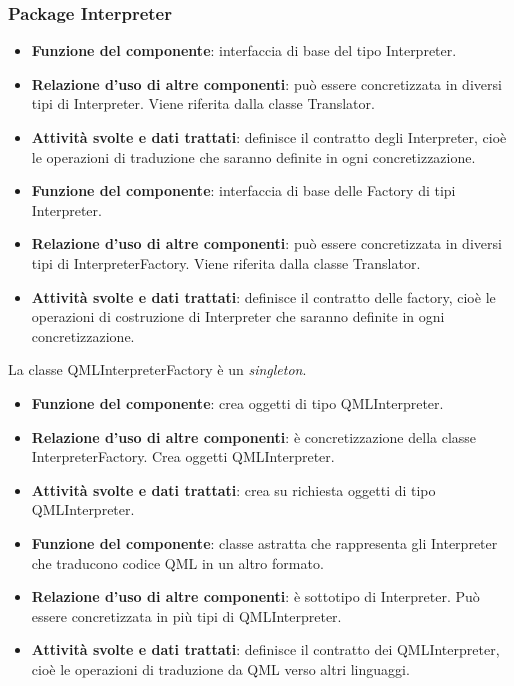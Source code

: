 \documentclass[a4paper,11pt]{article}
\begin{document}
			\subsubsection{Package Interpreter}
			\begin{itemize}
				\item\textbf{Funzione del componente}: interfaccia di base del tipo Interpreter.
				\item\textbf{Relazione d'uso di altre componenti}: può essere concretizzata in diversi tipi di Interpreter. Viene riferita dalla classe Translator.
				\item\textbf{Attività svolte e dati trattati}: definisce il contratto degli Interpreter, cioè le operazioni di traduzione che saranno definite in ogni concretizzazione.
			\end{itemize}
			\begin{itemize}
				\item\textbf{Funzione del componente}: interfaccia di base delle Factory di tipi Interpreter.
				\item\textbf{Relazione d'uso di altre componenti}: può essere concretizzata in diversi tipi di InterpreterFactory. Viene riferita dalla classe Translator.
				\item\textbf{Attività svolte e dati trattati}: definisce il contratto delle factory, cioè le operazioni di costruzione di Interpreter che saranno definite in ogni concretizzazione.
			\end{itemize}
			La classe QMLInterpreterFactory è un \emph{singleton}.
			\begin{itemize}
				\item\textbf{Funzione del componente}: crea oggetti di tipo QMLInterpreter.
				\item\textbf{Relazione d'uso di altre componenti}: è concretizzazione della classe InterpreterFactory. Crea oggetti QMLInterpreter.
				\item\textbf{Attività svolte e dati trattati}: crea su richiesta oggetti di tipo QMLInterpreter.
			\end{itemize}
			\begin{itemize}
				\item\textbf{Funzione del componente}: classe astratta che rappresenta gli Interpreter che traducono codice QML in un altro formato.
				\item\textbf{Relazione d'uso di altre componenti}: è sottotipo di Interpreter. Può essere concretizzata in più tipi di QMLInterpreter.
				\item\textbf{Attività svolte e dati trattati}: definisce il contratto dei QMLInterpreter, cioè le operazioni di traduzione da QML verso altri linguaggi.
			\end{itemize}
\end{document}
